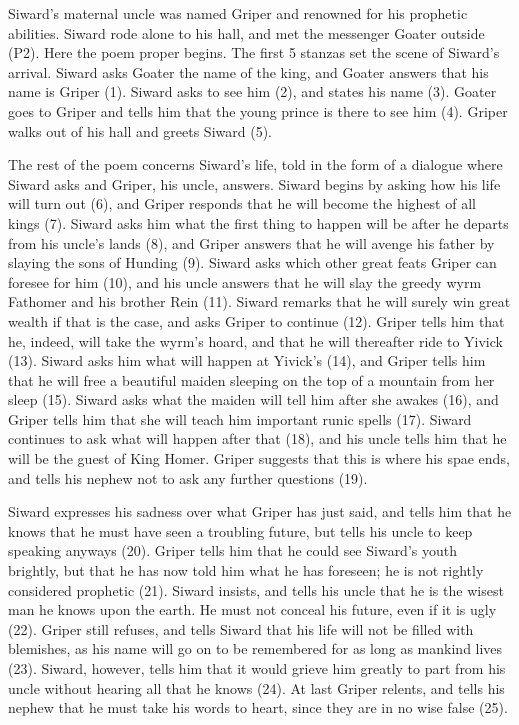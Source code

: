Siward’s maternal uncle was named Griper and renowned for his prophetic abilities.  Siward rode alone to his hall, and met the messenger Goater outside (P2).  Here the poem proper begins.
The first 5 stanzas set the scene of Siward’s arrival.  Siward asks Goater the name of the king, and Goater answers that his name is Griper (1).  Siward asks to see him (2), and states his name (3).  Goater goes to Griper and tells him that the young prince is there to see him (4).  Griper walks out of his hall and greets Siward (5).

The rest of the poem concerns Siward’s life, told in the form of a dialogue where Siward asks and Griper, his uncle, answers.  Siward begins by asking how his life will turn out (6), and Griper responds that he will become the highest of all kings (7).  Siward asks him what the first thing to happen will be after he departs from his uncle’s lands (8), and Griper answers that he will avenge his father by slaying the sons of Hunding (9).  Siward asks which other great feats Griper can foresee for him (10), and his uncle answers that he will slay the greedy wyrm Fathomer and his brother Rein (11).  Siward remarks that he will surely win great wealth if that is the case, and asks Griper to continue (12).  Griper tells him that he, indeed, will take the wyrm’s hoard, and that he will thereafter ride to Yivick (13).  Siward asks him what will happen at Yivick’s (14), and Griper tells him that he will free a beautiful maiden sleeping on the top of a mountain from her sleep (15).  Siward asks what the maiden will tell him after she awakes (16), and Griper tells him that she will teach him important runic spells (17).  Siward continues to ask what will happen after that (18), and his uncle tells him that he will be the guest of King Homer.  Griper suggests that this is where his spae ends, and tells his nephew not to ask any further questions (19).

Siward expresses his sadness over what Griper has just said, and tells him that he knows that he must have seen a troubling future, but tells his uncle to keep speaking anyways (20).  Griper tells him that he could see Siward’s youth brightly, but that he has now told him what he has foreseen; he is not rightly considered prophetic (21).  Siward insists, and tells his uncle that he is the wisest man he knows upon the earth.  He must not conceal his future, even if it is ugly (22).  Griper still refuses, and tells Siward that his life will not be filled with blemishes, as his name will go on to be remembered for as long as mankind lives (23).  Siward, however, tells him that it would grieve him greatly to part from his uncle without hearing all that he knows (24).  At last Griper relents, and tells his nephew that he must take his words to heart, since they are in no wise false (25).

